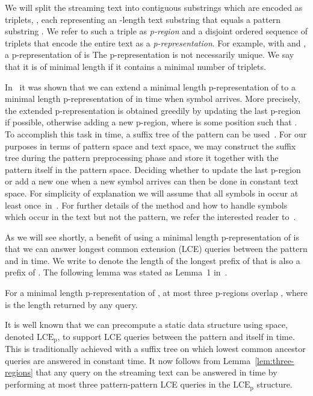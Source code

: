 \documentclass[envcountsame]{llncs}
\newcommand{\pregion}{\mbox{p-region}\xspace}
\newcommand{\pregions}{\mbox{p-regions}\xspace}
\newcommand{\prepresentation}{\mbox{p-representation}\xspace}
\newcommand{\LCEP}{\ensuremath{\text{LCE}_\text{p}}\xspace}
\begin{document}
We will split the streaming text into contiguous substrings which are encoded as triplets, , each representing an -length text substring  that equals a pattern substring . We refer to such a triple as \emph{\pregion} and a disjoint ordered sequence of triplets that encode the entire text as a \emph{\prepresentation}. For example, with  and , a \prepresentation of  is  The \prepresentation is not necessarily unique. We say that it is of minimal length if it contains a minimal number of triplets.

In~\cite{CS:2010} it was shown that we can extend a minimal length \prepresentation of  to a minimal length \prepresentation of  in  time when symbol  arrives. More precisely, the extended \prepresentation is obtained greedily by updating the last \pregion if possible, otherwise adding a new \pregion , where  is some position such that .
To accomplish this task in  time, a suffix tree of the pattern
can be used~\cite{CS:2010}. For our purposes in terms of pattern space
and text space, we may construct the suffix tree during the pattern
preprocessing phase and store it together with the pattern itself in
the pattern space. Deciding whether to update the last \pregion or add
a new one when a new symbol  arrives can then be done in
constant text space. For simplicity of explanation we will assume that
all symbols in  occur at least once~in~.  For further details of
the method and how to handle symbols which occur in the text but not
the pattern, we refer the interested reader to~\cite{CS:2010}.

As we will see shortly, a benefit of using a minimal length \prepresentation of  is that we can answer longest common extension (LCE) queries between the pattern and  in  time. We write  to denote the length of the longest prefix of  that is also a prefix of .
The following lemma was stated as Lemma~1 in~\cite{CS:2010}.

\begin{lemma}
    \label{lem:three-regions}
    For a minimal length \prepresentation of , at most three \pregions overlap , where  is the length returned by any  query.
\end{lemma}

It is well known that we can precompute a static data structure using
 space, denoted \LCEP, to support LCE queries between the
pattern and itself in  time. This is traditionally achieved with
a suffix tree on which lowest common ancestor queries are answered in
constant time. It now follows from Lemma~\ref{lem:three-regions} that
any  query on the streaming text can be answered in  time by performing at most three pattern-pattern LCE queries in the \LCEP structure.
\end{document}
